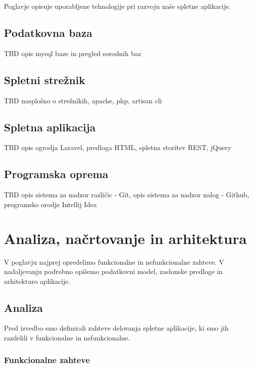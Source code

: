 \documentclass[a4paper, 12pt]{book}
\begin{document}
Poglavje opisuje uporabljene tehnologije pri razvoju naše spletne aplikacije.

\section{Podatkovna baza}

TBD opis mysql baze in pregled sorodnih baz

\section{Spletni strežnik}

TBD nasplošno o strežnikih, apache, php, artisan cli

\section{Spletna aplikacija}

TBD opis ogrodja Laravel, predloga HTML, spletna storitev REST, jQuery

\section{Programska oprema}

TBD opis sistema za nadzor različic - Git, opis sistema za nadzor nalog - Github, programsko orodje Intellij Idea



\chapter{Analiza, načrtovanje in arhitektura}
\label{analiza-nacrtovanje-arhitektura}

V poglavju najprej opredelimo funkcionalne in nefunkcionalne zahteve. V nadaljevanju podrobno opišemo podatkovni model, zaslonske predloge in arhitekturo aplikacije.


\section{Analiza}

Pred izvedbo smo definirali zahteve delovanja spletne aplikacije, ki smo jih razdelili v funkcionalne in nefunkcionalne.


\subsection{Funkcionalne zahteve}
\end{document}
